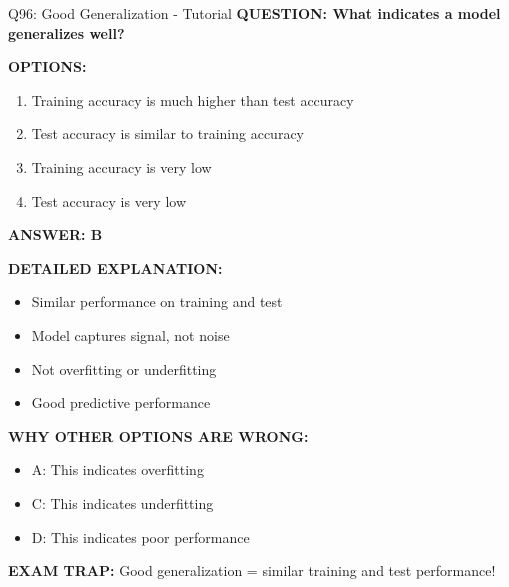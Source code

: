 \documentclass[8pt]{beamer}
\begin{document}
	\begin{frame}{Q96: Good Generalization - Tutorial}
		\fontsize{6.5}{7.5}\selectfont
		\textbf{QUESTION: What indicates a model generalizes well?}
		
		\vspace{0.1cm}
		\textbf{OPTIONS:}
		\begin{enumerate}
			\item Training accuracy is much higher than test accuracy
			\item Test accuracy is similar to training accuracy
			\item Training accuracy is very low
			\item Test accuracy is very low
		\end{enumerate}
		
		\vspace{0.1cm}
		\textcolor{myblue}{\textbf{ANSWER: B}}
		
		\vspace{0.1cm}
		\textbf{DETAILED EXPLANATION:}
		\begin{itemize}
			\item Similar performance on training and test
			\item Model captures signal, not noise
			\item Not overfitting or underfitting
			\item Good predictive performance
		\end{itemize}
		
		\vspace{0.1cm}
		\textcolor{myred}{\textbf{WHY OTHER OPTIONS ARE WRONG:}}
		\begin{itemize}
			\item \textcolor{myred}{A:} This indicates overfitting
			\item \textcolor{myred}{C:} This indicates underfitting
			\item \textcolor{myred}{D:} This indicates poor performance
		\end{itemize}
		
		\textcolor{myred}{\textbf{EXAM TRAP:}} Good generalization = \textcolor{myblue}{similar training and test performance}!
	\end{frame}
	
\end{document}
